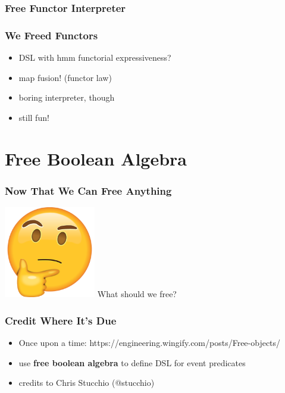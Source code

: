 \documentclass{beamer}
\begin{document}
\begin{frame}[fragile]
  \frametitle{Free Functor Interpreter}
\end{frame}

\begin{frame}
  \frametitle{We Freed Functors}
  \begin{itemize}
  \item<1-> DSL with hmm functorial expressiveness?
  \item<1-> map fusion! (functor law)
  \item<1-> boring interpreter, though
  \item<2-> still fun!
  \end{itemize}
\end{frame}

\section{Free Boolean Algebra}\label{sec:free-boolean-algebra}

\begin{frame}
  \frametitle{Now That We Can Free Anything}
  \begin{center}
    \includegraphics[width=0.3\textwidth]{static-images/thinking.png}
    \vfill
    {\Huge What should we free?}
    \vfill
  \end{center}
\end{frame}

\begin{frame}
  \frametitle{Credit Where It's Due}
  \begin{itemize}
  \item Once upon a time:
    https://engineering.wingify.com/posts/Free-objects/
  \item use \textbf{free boolean algebra} to define DSL for event
    predicates
  \item credits to Chris Stucchio (@stucchio)
  \end{itemize}
\end{frame}
\end{document}
